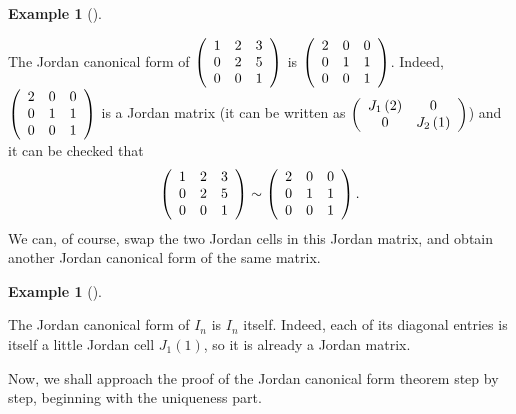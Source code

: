 \documentclass[numbers=enddot,12pt,final,onecolumn,notitlepage]{scrartcl}%
\numberwithin{exer}{subsection}
\theoremstyle{definition}
\newtheorem{exam}[theo]{Example}
\newenvironment{example}[1][]
{\begin{exam}[#1]\begin{leftbar}}
{\end{leftbar}\end{exam}}
\begin{document}
\begin{example}
The Jordan canonical form of $\left(
\begin{array}
[c]{ccc}%
1 & 2 & 3\\
0 & 2 & 5\\
0 & 0 & 1
\end{array}
\right)  $ is $\left(
\begin{array}
[c]{ccc}%
2 & 0 & 0\\
0 & 1 & 1\\
0 & 0 & 1
\end{array}
\right)  $. Indeed, $\left(
\begin{array}
[c]{ccc}%
2 & 0 & 0\\
0 & 1 & 1\\
0 & 0 & 1
\end{array}
\right)  $ is a Jordan matrix (it can be written as $\left(
\begin{array}
[c]{cc}%
J_{1}\left(  2\right)   & 0\\
0 & J_{2}\left(  1\right)
\end{array}
\right)  $) and it can be checked that%
\[
\left(
\begin{array}
[c]{ccc}%
1 & 2 & 3\\
0 & 2 & 5\\
0 & 0 & 1
\end{array}
\right)  \sim\left(
\begin{array}
[c]{ccc}%
2 & 0 & 0\\
0 & 1 & 1\\
0 & 0 & 1
\end{array}
\right)  .
\]
We can, of course, swap the two Jordan cells in this Jordan matrix, and obtain
another Jordan canonical form of the same matrix.
\end{example}

\begin{example}
The Jordan canonical form of $I_{n}$ is $I_{n}$ itself. Indeed, each of its
diagonal entries is itself a little Jordan cell $J_{1}\left(  1\right)  $, so
it is already a Jordan matrix.
\end{example}

Now, we shall approach the proof of the Jordan canonical form theorem step by
step, beginning with the uniqueness part.
\end{document}
